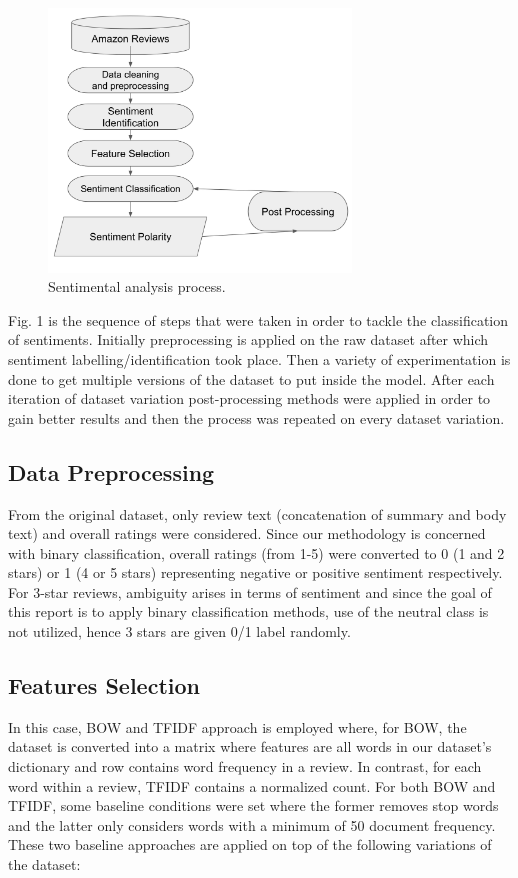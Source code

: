\documentclass[conference , 11pt]{IEEEtran}
\begin{document}
\begin{figure}[htbp]
\centerline{\includegraphics[width=\columnwidth , height=7cm]{flowchart.png}}
\caption{Sentimental analysis process.}
\label{fig}
\end{figure}
\FloatBarrier
Fig. 1 is the sequence of steps that were taken in order to tackle the classification of sentiments. Initially preprocessing is applied on the raw dataset after which sentiment labelling/identification took place. Then a variety of experimentation is done to get multiple versions of the dataset to put inside the model. After each iteration of dataset variation post-processing methods were applied in order to gain better results and then the process was repeated on every dataset variation.

\subsection{Data Preprocessing}
From the original dataset, only review text (concatenation of summary and body text) and overall ratings were considered. Since our methodology is concerned with binary classification, overall ratings (from 1-5) were converted to 0 (1 and 2 stars)  or 1 (4 or 5 stars) representing negative or positive sentiment respectively. For 3-star reviews, ambiguity arises in terms of sentiment and since the goal of this report is to apply binary classification methods, use of the neutral class is not utilized, hence 3 stars are given 0/1 label randomly.

\subsection{Features Selection}
In this case, BOW and TFIDF approach is employed where, for BOW, the dataset is converted into a matrix where features are all words in our dataset’s dictionary and row contains word frequency in a review. In contrast, for each word within a review, TFIDF contains a normalized count. For both BOW and TFIDF, some baseline conditions were set where the former removes stop words and the latter only considers words with a minimum of 50 document frequency. These two baseline approaches are applied on top of the following variations of the dataset:
\end{document}
